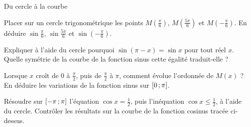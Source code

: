 \begin{exercice}[1]{Du cercle à la courbe\enspace\otNouveau}
\begin{codecote}[0.57]
\begin{questions}
  \item Placer sur un cercle trigonométrique les points $M\left(\frac{\pi}{6}\right)$, $M\left(\frac{5\pi}{6}\right)$ et
    $M\left(-\frac{\pi}{6}\right)$. En déduire $\sin\frac{\pi}{6}$, $\sin\frac{5\pi}{6}$ et $\sin\left(-\frac{\pi}{6}\right)$.
  \item Expliquer à l'aide du cercle pourquoi $\sin(\pi-x)=\sin x$ pour tout réel $x$. Quelle symétrie de la courbe de la
    fonction sinus cette égalité traduit-elle ?
  \item Lorsque $x$ croît de $0$ à $\frac{\pi}{2}$, puis de $\frac{\pi}{2}$ à $\pi$, comment évolue l'ordonnée de $M(x)$ ?
    En déduire les variations de la fonction sinus sur $\mathopen{[}0\,{;}\,\pi\mathclose{]}$.
\end{questions}
\cote
\centering
{}
\end{codecote}
\begin{questions}[start=4]
  \item Résoudre sur $\mathopen{[}-\pi\,{;}\,\pi\mathclose{]}$ l'équation $\cos x=\frac12$, puis l'inéquation $\cos x\leq\frac12$, à l'aide du cercle.
    Contrôler les résultats sur la courbe de la fonction cosinus tracée ci-dessus.
\end{questions}
\end{exercice}


